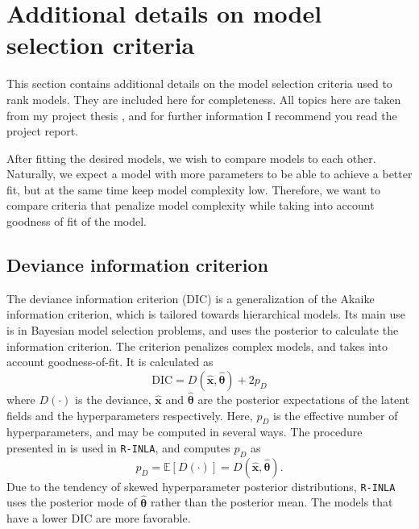 \section{Additional details on model selection criteria}
\label{section:disease-mapping:criteria}
This section contains additional details on the model selection criteria used to rank models. They are included here for completeness. All topics here are taken from my project thesis \citep{Prosjektoppgave}, and for further information I recommend you read the project report. 

After fitting the desired models, we wish to compare models to each other. Naturally, we expect a model with more parameters to be able to achieve a better fit, but at the same time keep model complexity low. Therefore, we want to compare criteria that penalize model complexity while taking into account goodness of fit of the model. 

\subsection*{Deviance information criterion}
\label{section:disease-mapping:criteria:DIC}
The deviance information criterion (DIC) \citep{DIC} is a generalization of the Akaike information criterion, which is tailored towards hierarchical models. Its main use is in Bayesian model selection problems, and uses the posterior to calculate the information criterion. The criterion penalizes complex models, and takes into account goodness-of-fit. It is calculated as
\begin{equation}
    \text{DIC} = D( \hat{\pmb x}, \hat{\pmb \theta}) +  2p_D
    \label{eqn:DIC}
\end{equation}
where $D(\cdot)$ is the deviance, $\hat{\pmb x}$ and $\hat{\pmb\theta}$ are the posterior expectations of the latent fields and the hyperparameters respectively. Here, $p_D$ is the effective number of hyperparameters, and may be computed in several ways. The procedure presented in \cite{DIC} is used in \texttt{R-INLA}, and computes $p_D$ as
\begin{equation*}
    p_D = \mathbb{E}[D(\cdot)] = D(\hat{\pmb x}, \hat{\pmb \theta}).
    \label{eqn:DIC-pD}
\end{equation*}
Due to the tendency of skewed hyperparameter posterior distributions, \texttt{R-INLA} uses the posterior mode of $\hat{\pmb \theta}$ rather than the posterior mean. The models that have a lower DIC are more favorable.


